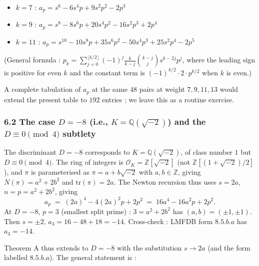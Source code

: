 \documentclass[
  11pt,
  a4paper,
]{amsart}
\providecommand{\tightlist}{\setlength{\itemsep}{0pt}\setlength{\parskip}{0pt}}
\providecommand{\tightlist}{%
  \setlength{\itemsep}{0pt}\setlength{\parskip}{0pt}}
\begin{document}
\begin{itemize}
\tightlist
\item
  \(k = 7\) : \(a_p = s^6 - 6 s^4 p + 9 s^2 p^2 - 2 p^3\)
\item
  \(k = 9\) : \(a_p = s^8 - 8 s^6 p + 20 s^4 p^2 - 16 s^2 p^3 + 2 p^4\)
\item
  \(k = 11\) : \(a_p = s^{10} - 10 s^8 p + 35 s^6 p^2 - 50 s^4 p^3 + 25 s^2 p^4 - 2 p^5\)
\end{itemize}

(General formula : \(p_k = \sum_{j = 0}^{\lfloor k/2 \rfloor} (-1)^j \frac{k}{k - j} \binom{k - j}{j} s^{k - 2j} p^j\), where the leading sign is positive for even \(k\) and the constant term is \((-1)^{k/2} \cdot 2 \cdot p^{k/2}\) when \(k\) is even.)

A complete tabulation of \(a_p\) at the same \(48\) pairs at weight \(7, 9, 11, 13\) would extend the present table to \(192\) entries ; we leave this as a routine exercise.

\hypertarget{the-case-d--8-i.e.-k-mathbbqsqrt-2-and-the-d-equiv-0-pmod-4-subtlety}{%
\subsubsection{\texorpdfstring{6.2 The case \(D = -8\) (i.e., \(K = \mathbb{Q}(\sqrt{-2})\)) and the \(D \equiv 0 \pmod 4\) subtlety}{6.2 The case D = -8 (i.e., K = \textbackslash mathbb\{Q\}(\textbackslash sqrt\{-2\})) and the D \textbackslash equiv 0 \textbackslash pmod 4 subtlety}}\label{the-case-d--8-i.e.-k-mathbbqsqrt-2-and-the-d-equiv-0-pmod-4-subtlety}}

The discriminant \(D = -8\) corresponds to \(K = \mathbb{Q}(\sqrt{-2})\), of class number \(1\) but \(D \equiv 0 \pmod 4\). The ring of integers is \(\mathcal{O}_K = \mathbb{Z}[\sqrt{-2}]\) (not \(\mathbb{Z}[(1 + \sqrt{-2})/2]\)), and \(\pi\) is parameterised as \(\pi = a + b\sqrt{-2}\) with \(a, b \in \mathbb{Z}\), giving \(N(\pi) = a^2 + 2 b^2\) and \(\mathrm{tr}(\pi) = 2a\). The Newton recursion thus uses \(s = 2a\), \(n = p = a^2 + 2 b^2\), giving
\[
a_p \;=\; (2a)^4 - 4 (2a)^2 p + 2 p^2 \;=\; 16 a^4 - 16 a^2 p + 2 p^2.
\]
At \(D = -8\), \(p = 3\) (smallest split prime) : \(3 = a^2 + 2 b^2\) has \((a, b) = (\pm 1, \pm 1)\). Then \(s = \pm 2\), \(a_3 = 16 - 48 + 18 = -14\). Cross-check : LMFDB form \(8.5.b.a\) has \(a_3 = -14\).

Theorem A thus extends to \(D = -8\) with the substitution \(s \to 2a\) (and the form labelled \(8.5.b.a\)). The general statement is :
\end{document}
